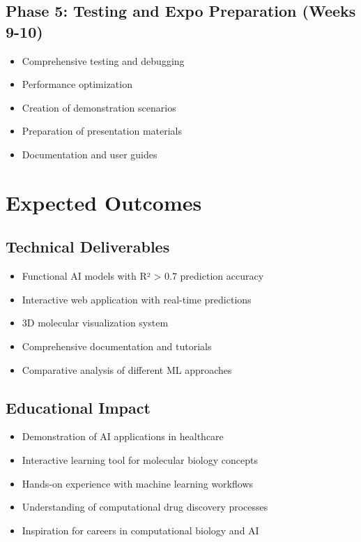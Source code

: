 \documentclass[12pt,a4paper]{article}
\begin{document}
\subsection{Phase 5: Testing and Expo Preparation (Weeks 9-10)}
\begin{itemize}
    \item Comprehensive testing and debugging
    \item Performance optimization
    \item Creation of demonstration scenarios
    \item Preparation of presentation materials
    \item Documentation and user guides
\end{itemize}

\section{Expected Outcomes}

\subsection{Technical Deliverables}
\begin{itemize}
    \item Functional AI models with R² > 0.7 prediction accuracy
    \item Interactive web application with real-time predictions
    \item 3D molecular visualization system
    \item Comprehensive documentation and tutorials
    \item Comparative analysis of different ML approaches
\end{itemize}

\subsection{Educational Impact}
\begin{itemize}
    \item Demonstration of AI applications in healthcare
    \item Interactive learning tool for molecular biology concepts
    \item Hands-on experience with machine learning workflows
    \item Understanding of computational drug discovery processes
    \item Inspiration for careers in computational biology and AI
\end{itemize}
\end{document}
